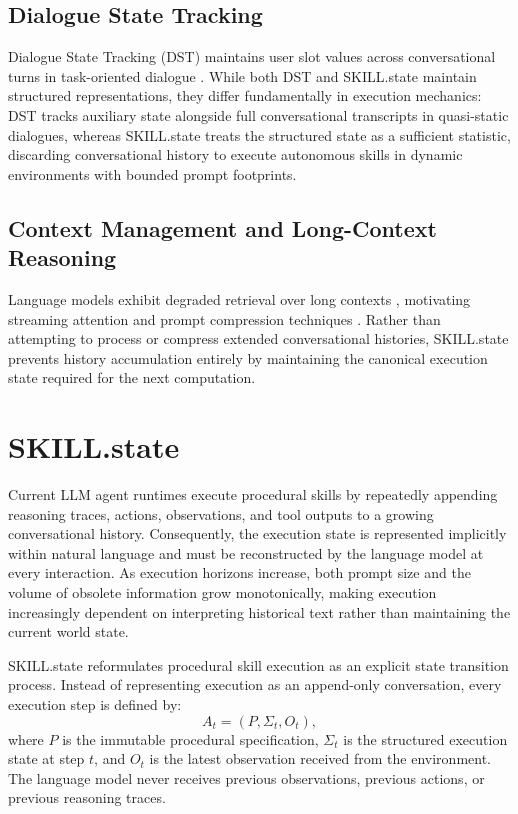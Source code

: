 \documentclass[11pt]{article}
\begin{document}
\subsection{Dialogue State Tracking}
Dialogue State Tracking (DST) maintains user slot values across conversational turns in task-oriented dialogue \citep{williams2013dialog, henderson2014second, rastogi2020towards, wu2019transferable, heck2020trippy, hosseini2020simple}. While both DST and SKILL.state maintain structured representations, they differ fundamentally in execution mechanics: DST tracks auxiliary state alongside full conversational transcripts in quasi-static dialogues, whereas SKILL.state treats the structured state as a sufficient statistic, discarding conversational history to execute autonomous skills in dynamic environments with bounded prompt footprints.

\subsection{Context Management and Long-Context Reasoning}
Language models exhibit degraded retrieval over long contexts \citep{liu2024lost, zhang2024bench}, motivating streaming attention \citep{xiao2024streamingllm} and prompt compression techniques \citep{jiang2023llmlingua, li2023compressing}. Rather than attempting to process or compress extended conversational histories, SKILL.state prevents history accumulation entirely by maintaining the canonical execution state required for the next computation.


\section{SKILL.state}
\label{sec:skillstate}

Current LLM agent runtimes execute procedural skills by repeatedly appending reasoning traces, actions, observations, and tool outputs to a growing conversational history. Consequently, the execution state is represented implicitly within natural language and must be reconstructed by the language model at every interaction. As execution horizons increase, both prompt size and the volume of obsolete information grow monotonically, making execution increasingly dependent on interpreting historical text rather than maintaining the current world state.

SKILL.state reformulates procedural skill execution as an explicit state transition process. Instead of representing execution as an append-only conversation, every execution step is defined by:
\begin{equation}
A_t = (P,\Sigma_t,O_t),
\end{equation}
where $P$ is the immutable procedural specification, $\Sigma_t$ is the structured execution state at step $t$, and $O_t$ is the latest observation received from the environment. The language model never receives previous observations, previous actions, or previous reasoning traces.
\end{document}
